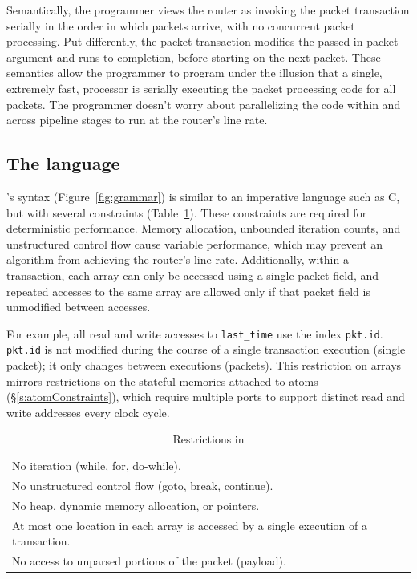 Semantically, the programmer views the router as invoking the packet
transaction serially in the order in which packets arrive, with no concurrent
packet processing.  Put differently, the packet transaction modifies the
passed-in packet argument and runs to completion, before starting on the next
packet.  These semantics allow the programmer to program under the illusion
that a single, extremely fast, processor is serially executing the packet
processing code for all packets. The programmer doesn't worry about
parallelizing the code within and across pipeline stages to run at the router's
line rate.

\subsection{The \pktlanguage language}
\label{ss:constraints}
\pktlanguage's syntax (Figure~\ref{fig:grammar}) is similar to an imperative
language such as C, but with several constraints (Table~\ref{tab:restrict}).
These constraints are required for deterministic performance.  Memory
allocation, unbounded iteration counts, and unstructured control flow cause
variable performance, which may prevent an algorithm from achieving the
router's line rate.  Additionally, within a \pktlanguage transaction, each
array can only be accessed using a single packet field, and repeated accesses
to the same array are allowed only if that packet field is unmodified between
accesses.

For example, all read and write accesses to \texttt{last\_time} use the index
\texttt{pkt.id}. \texttt{pkt.id} is not modified during the course of a single
transaction execution (single packet); it only changes between executions
(packets).  This restriction on arrays mirrors restrictions on the stateful
memories attached to atoms (\S\ref{s:atomConstraints}), which require multiple
ports to support distinct read and write addresses every clock cycle.

\begin{table}
  \begin{tabular}{p{}}
   No iteration (while, for, do-while).\\
   No unstructured control flow (goto, break, continue).\\
   No heap, dynamic memory allocation, or pointers.\\
   At most one location in each array is accessed by a single execution of a transaction. \\
   No access to unparsed portions of the packet (payload).\\
  \end{tabular}
  \caption{Restrictions in \pktlanguage}
  \label{tab:restrict}
\end{table}

